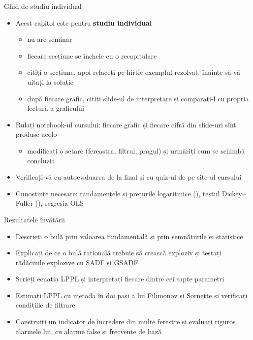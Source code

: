 \begin{frame}{Ghid de studiu individual}
\itemsize{\small}
\begin{itemize}
    \item Acest capitol este pentru \textbf{studiu individual}
    \begin{itemize}
        \item nu are seminar
        \item fiecare secțiune se încheie cu o recapitulare
        \item citiți o secțiune, apoi refaceți pe hîrtie exemplul rezolvat, înainte să vă uitați la soluție
        \item după fiecare grafic, citiți slide-ul de interpretare și comparați-l cu propria lectură a graficului
    \end{itemize}
    \item Rulați notebook-ul cursului: fiecare grafic și fiecare cifră din slide-uri sînt produse acolo
    \begin{itemize}
        \item modificați o setare (fereastra, filtrul, pragul) și urmăriți cum se schimbă concluzia
    \end{itemize}
    \item Verificați-vă cu autoevaluarea de la final și cu quiz-ul  de pe site-ul cursului
    \item Cunoștințe necesare: randamentele și prețurile logaritmice (), testul Dickey--Fuller (), regresia OLS
\end{itemize}
\end{frame}

\begin{frame}{Rezultatele învățării}
\itemsize{\small}
\begin{itemize}
    \item Descrieți o bulă prin valoarea fundamentală și prin semnăturile ei statistice
    \item Explicați de ce o bulă rațională trebuie să crească exploziv și testați rădăcinile explozive cu SADF și GSADF
    \item Scrieți ecuația LPPL și interpretați fiecare dintre cei șapte parametri
    \item Estimați LPPL cu metoda în doi pași a lui Filimonov și Sornette și verificați condițiile de filtrare
    \item Construiți un indicator de încredere din multe ferestre și evaluați riguros alarmele lui, cu alarme false și frecvențe de bază
\end{itemize}
\end{frame}

